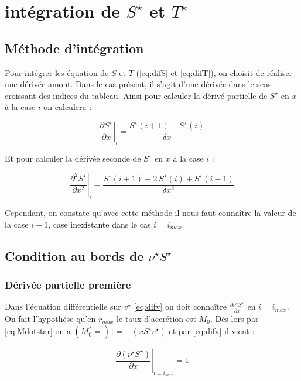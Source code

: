 \section{intégration de $S^{\star}$ et $T^{\star}$}

\subsection{Méthode d'intégration}

Pour intégrer les équation de $S$ et $T$ (\eqref{eq:difS} et \eqref{eq:difT}), on choisit de réaliser une dérivée amont. Dans le cas présent, il s'agit d'une dérivée dans le sens croissant des indices du tableau. Ainsi pour calculer la dérivé partielle de $S^{\star}$ en $x$ à la case $i$ on calculera :

\begin{equation}
  \left. \frac{\partial S^{\star}}{\partial x} \right|_i = \frac{S^{\star}(i+1)-S^{\star}(i)}{\delta x} 
\end{equation}

Et pour calculer la dérivée seconde de $S^{\star}$ en $x$ à la case $i$ :

\begin{equation}
  \left. \frac{\partial^2 S^{\star}}{\partial x^2}\right|_i=\frac{S^{\star}(i+1)-2\ S^{\star}(i) +S^{\star}(i-1)}{\delta x^2} 
\end{equation}

Cependant, on constate qu'avec cette méthode il nous faut connaître la valeur de la case $i+1$, case inexistante dans le cas $i=i_{max}$.

\subsection{Condition au bords de $\nu^{\star}S^{\star}$}

\subsubsection{Dérivée partielle première}

Dans l'équation différentielle sur $v^{\star}$ \eqref{eq:difv} on doit connaître $\frac{\partial \nu^{\star} S^{\star}}{\partial x}$ en $i=i_{max}$.
On fait l'hypothèse qu'en $r_{max}$ le taux d'accrétion est $\dot{M}_0$. Dés lors par \eqref{eq:Mdotstar} on a $(\dot{M}^{\star}_0=)1 = -(x S^{\star}v^{\star})$ et par \eqref{eq:difv} il vient :

\begin{equation}
  \label{eq:nuS_n_is_null}
  \left. \frac{\partial (\nu^{\star} S^{\star})}{\partial x}\right|_{i=i_{max}}=1
\end{equation}



